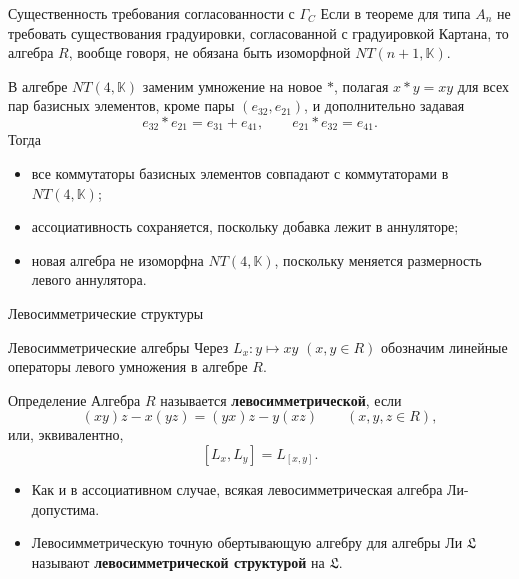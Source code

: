 \documentclass[12pt,aspectratio=169]{beamer}
\newcommand{\K}{\mathbb{K}}
\newcommand{\term}[1]{{\color{MainRed}\bfseries #1}}
\begin{document}
\begin{frame}[t]{Существенность требования согласованности с $\Gamma_C$}
    \small
    Если в теореме для типа $A_n$ не требовать существования градуировки,
    согласованной с градуировкой Картана, то алгебра $R$, вообще говоря, не
    обязана быть изоморфной $NT(n+1,\K)$.

    \medskip

    В алгебре $NT(4,\K)$ заменим умножение на новое $\ast$, полагая $x\ast y=xy$
    для всех пар базисных элементов, кроме пары $(e_{32},e_{21})$, и дополнительно
    задавая
    \[
        e_{32}\ast e_{21}=e_{31}+e_{41},\qquad e_{21}\ast e_{32}=e_{41}.
    \]
    Тогда
    \begin{itemize}
        \item все коммутаторы базисных элементов совпадают с коммутаторами в $NT(4,\K)$;
        \item ассоциативность сохраняется, поскольку добавка лежит в аннуляторе;
        \item новая алгебра не изоморфна $NT(4,\K)$, поскольку меняется размерность левого
              аннулятора.
    \end{itemize}
\end{frame}

\begin{frame}[plain]
    \vfill
    \begin{center}
        {Левосимметрические структуры\par}
    \end{center}
    \vfill
\end{frame}

\begin{frame}[t]{Левосимметрические алгебры}
    \small
    Через $L_x\colon y\mapsto xy$ $(x,y \in R)$ обозначим линейные операторы левого
    умножения в алгебре $R$.

    \begin{block}{Определение}
        Алгебра $R$ называется \term{левосимметрической}, если
        \[
            (xy)z-x(yz)=(yx)z-y(xz)\qquad (x,y,z\in R),
        \]
        или, эквивалентно,
        \[
            [L_x,L_y]=L_{[x,y]}.
        \]
    \end{block}

    \begin{itemize}
        \item Как и в ассоциативном случае, всякая левосимметрическая алгебра Ли-допустима.
        \item Левосимметрическую точную обертывающую алгебру для алгебры Ли $\mathfrak L$
              называют \term{левосимметрической структурой} на $\mathfrak L$.
    \end{itemize}
\end{frame}
\end{document}
